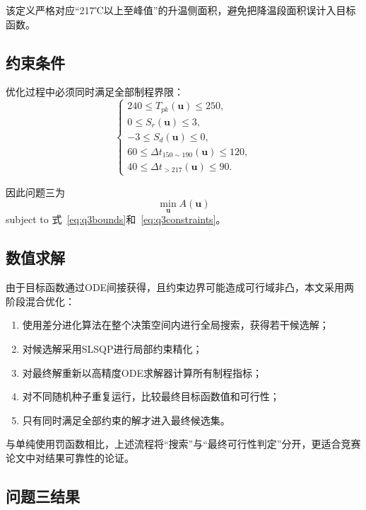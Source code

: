 \documentclass{cumcmthesis}
\begin{document}
该定义严格对应“217℃以上至峰值”的升温侧面积，避免把降温段面积误计入目标函数。

\subsection{约束条件}

优化过程中必须同时满足全部制程界限：
\begin{equation}
\begin{cases}
240\le T_{pk}(\boldsymbol u)\le250,\\
0\le S_r(\boldsymbol u)\le3,\\
-3\le S_d(\boldsymbol u)\le0,\\
60\le\Delta t_{150\sim190}(\boldsymbol u)\le120,\\
40\le\Delta t_{>217}(\boldsymbol u)\le90.
\end{cases}
\label{eq:q3constraints}
\end{equation}

因此问题三为
\begin{equation}
\boxed{
\min_{\boldsymbol u}A(\boldsymbol u)
}
\end{equation}
subject to 式~\eqref{eq:q3bounds}和~\eqref{eq:q3constraints}。

\subsection{数值求解}

由于目标函数通过ODE间接获得，且约束边界可能造成可行域非凸，本文采用两阶段混合优化：

\begin{enumerate}
    \item 使用差分进化算法在整个决策空间内进行全局搜索，获得若干候选解；
    \item 对候选解采用SLSQP进行局部约束精化；
    \item 对最终解重新以高精度ODE求解器计算所有制程指标；
    \item 对不同随机种子重复运行，比较最终目标函数值和可行性；
    \item 只有同时满足全部约束的解才进入最终候选集。
\end{enumerate}

与单纯使用罚函数相比，上述流程将“搜索”与“最终可行性判定”分开，更适合竞赛论文中对结果可靠性的论证。

\subsection{问题三结果}
\end{document}
